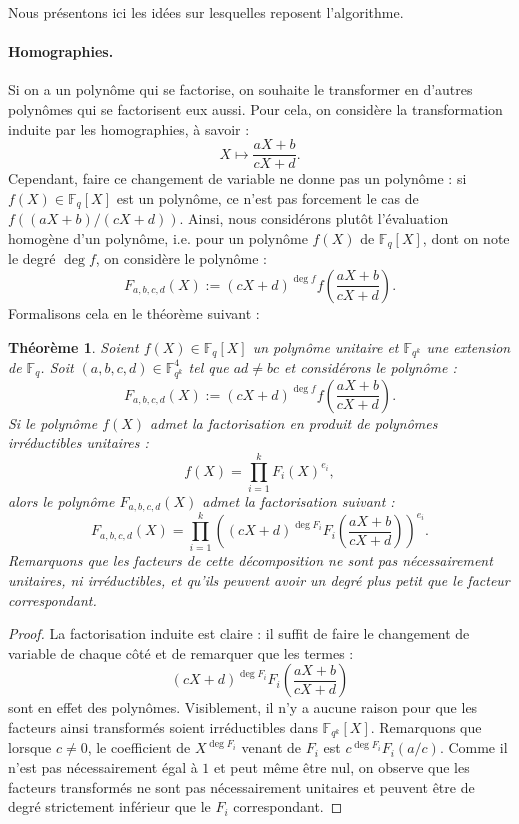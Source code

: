 \documentclass[a4paper, titlepage, 11pt]{article}
\newtheorem{theo}{Théorème}[section]
\theoremstyle{definition}
\theoremstyle{remark}
\def\gf #1{\mathbb{F}_{#1}}
\begin{document}
Nous présentons ici les idées sur lesquelles reposent l'algorithme.

\paragraph*{Homographies.} Si on a un polynôme qui se factorise, on souhaite le transformer en d'autres polynômes qui se factorisent eux aussi. Pour cela, on considère la transformation induite par les homographies, à savoir :
$$X \mapsto \frac{aX+b}{cX+d}.$$
Cependant, faire ce changement de variable ne donne pas un polynôme : si $f(X) \in\gf{q}[X]$ est un polynôme, ce n'est pas forcement le cas de $f((aX+b)/(cX+d))$. Ainsi, nous considérons plutôt l'évaluation homogène d'un polynôme, i.e. pour un polynôme $f(X)$ de $\gf{q}[X]$, dont on note le degré $\deg f$, on considère le polynôme :
$$F_{a,b,c,d}(X) := (cX+d)^{\deg f} f \left(\frac{aX+b}{cX+d}\right).$$
Formalisons cela en le théorème suivant :
\begin{theo}
Soient $f(X) \in \gf{q}[X]$ un polynôme unitaire et $\gf{q^k}$ une extension de $\gf{q}$. Soit $(a,b,c,d) \in \gf{q^k}^4$ tel que $ad \neq bc$ et considérons le polynôme :
$$F_{a,b,c,d}(X) := (cX+d)^{\deg f} f \left(\frac{aX+b}{cX+d}\right).$$
Si le polynôme $f(X)$ admet la factorisation en produit de polynômes irréductibles unitaires : $$f(X) = \prod_{i=1}^k F_i(X)^{e_i},$$
alors le polynôme $F_{a,b,c,d}(X)$ admet la factorisation suivant :
$$F_{a,b,c,d}(X) = \prod_{i=1}^k {\left( (cX+d)^{\deg F_i} F_i\left(\frac{aX+b}{cX+d}\right)\right)}^{e_i}.$$
Remarquons que les facteurs de cette décomposition ne sont pas nécessairement unitaires, ni irréductibles, et qu'ils peuvent avoir un degré plus petit que le facteur correspondant.
\end{theo}
\begin{proof}
La factorisation induite est claire : il suffit de faire le changement de variable de chaque côté et de remarquer que les termes :
$$(cX+d)^{\deg F_i} F_i\left(\frac{aX+b}{cX+d}\right)$$
sont en effet des polynômes. Visiblement, il n'y a aucune raison pour que les facteurs ainsi transformés soient irréductibles dans $\gf{q^k}[X]$. Remarquons que lorsque $c \neq 0$, le coefficient de $X^{\deg{F_i}}$ venant de $F_i$ est $c^{\deg F_i}F_i(a/c)$. Comme il n'est pas nécessairement égal à $1$ et peut même être nul, on observe que les facteurs transformés ne sont pas nécessairement unitaires et peuvent être de degré strictement inférieur que le $F_i$ correspondant.
\end{proof}
\end{document}
